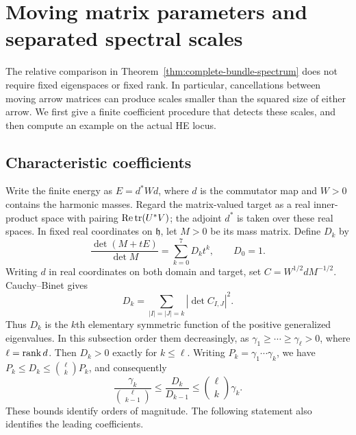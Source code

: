 \section{Moving matrix parameters and separated spectral scales}
\label{sec:moving-scales}

The relative comparison in Theorem~\ref{thm:complete-bundle-spectrum}
does not require fixed eigenspaces or fixed rank. In particular,
cancellations between moving arrow matrices can produce scales
smaller than the squared size of either arrow. We first give a
finite coefficient procedure that detects these scales, and then
compute an example on the actual HE locus.

\subsection{Characteristic coefficients}

Write the finite energy as $E=d^*Wd$, where $d$ is the
commutator map and $W>0$ contains the harmonic masses.
Regard the matrix-valued target as a real inner-product space
with pairing $\operatorname{Re}\operatorname{tr}(U^*V)$; the adjoint $d^*$
is taken over these real spaces. In fixed real coordinates
on $\mathfrak h$, let $M>0$ be its mass matrix.
Define $D_k$ by
\begin{equation}\label{eq:characteristic-coefficients}
 \frac{\det(M+tE)}{\det M}=\sum_{k=0}^7D_kt^k,
 \qquad D_0=1.
\end{equation}
Writing $d$ in real coordinates on both domain and target,
set $C=W^{1/2}dM^{-1/2}$. Cauchy--Binet gives
\begin{equation}\label{eq:minor-coefficients}
 D_k=\sum_{|I|=|J|=k}|\det C_{I,J}|^2.
\end{equation}
Thus $D_k$ is the $k$th elementary symmetric function of
the positive generalized eigenvalues. In this subsection
order them decreasingly, as $\gamma_1\ge\cdots\ge\gamma_\ell>0$,
where $\ell=\operatorname{rank} d$. Then $D_k>0$ exactly for $k\le\ell$.
Writing $P_k=\gamma_1\cdots\gamma_k$, we have
$P_k\le D_k\le\binom\ell k P_k$, and consequently
\begin{equation}\label{eq:coefficient-ratio-bounds}
 \frac{\gamma_k}{\binom\ell{k-1}}
 \le\frac{D_k}{D_{k-1}}\le\binom\ell k\gamma_k.
\end{equation}
These bounds identify orders of magnitude. The following
statement also identifies the leading coefficients.

